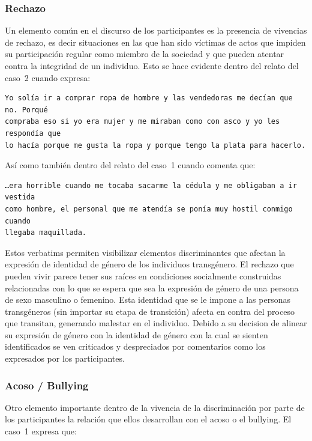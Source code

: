 \subsubsection{Rechazo}

Un elemento común en el discurso de los participantes es la presencia de
vivencias de rechazo, es decir situaciones en las que han sido víctimas de actos
que impiden su participación regular como miembro de la sociedad y que pueden
atentar contra la integridad de un individuo. Esto se hace evidente dentro del
relato del caso~2 cuando expresa:

\begin{verbatim}
Yo solía ir a comprar ropa de hombre y las vendedoras me decían que no. Porqué
compraba eso si yo era mujer y me miraban como con asco y yo les respondía que
lo hacía porque me gusta la ropa y porque tengo la plata para hacerlo.
\end{verbatim}

Así como también dentro del relato del caso~1 cuando comenta que:

\begin{verbatim}
…era horrible cuando me tocaba sacarme la cédula y me obligaban a ir vestida
como hombre, el personal que me atendía se ponía muy hostil conmigo cuando
llegaba maquillada.
\end{verbatim}

Estos verbatims permiten visibilizar elementos discriminantes que afectan la
expresión de identidad de género de los individuos transgénero. El rechazo que
pueden vivir parece tener sus raíces en condiciones socialmente construidas
relacionadas con lo que se espera que sea la expresión de género de una persona
de sexo masculino o femenino. Esta identidad que se le impone a las personas
transgéneros (sin importar su etapa de transición) afecta en contra del proceso
que transitan, generando malestar en el individuo. Debido a su decision de
alinear su expresión de género con la identidad de género con la cual se sienten
identificados se ven criticados y despreciados por comentarios como los
expresados por los participantes.

\subsubsection{Acoso / Bullying}

Otro elemento importante dentro de la vivencia de la discriminación por parte de
los participantes la relación que ellos desarrollan con el acoso o el bullying.
El caso~1 expresa que:

